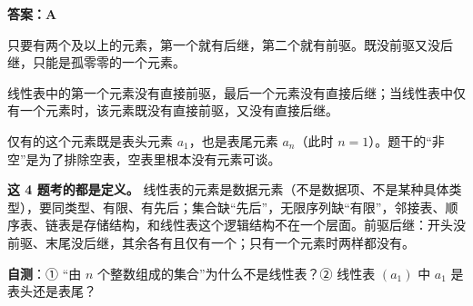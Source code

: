 \documentclass[10.5pt,a4paper,oneside]{article}
\newcommand{\hlred}[1]{\textcolor{wdred}{\bfseries #1}}
\begin{document}
\hlred{\textbf{答案：A}}

\begin{videobox}

只要有两个及以上的元素，第一个就有后继，第二个就有前驱。既没前驱又没后继，只能是孤零零的一个元素。

\end{videobox}

\begin{jiexibox}

线性表中的第一个元素没有直接前驱，最后一个元素没有直接后继；当线性表中仅有一个元素时，该元素既没有直接前驱，又没有直接后继。

\end{jiexibox}

\begin{addbox}

仅有的这个元素既是表头元素 \(a_1\)，也是表尾元素 \(a_n\)（此时
\(n=1\)）。题干的“非空”是为了排除空表，空表里根本没有元素可谈。

\end{addbox}

\begin{summarybox}

\textbf{这 4 题考的都是定义。}
线性表的元素是数据元素（不是数据项、不是某种具体类型），要同类型、有限、有先后；集合缺“先后”，无限序列缺“有限”，邻接表、顺序表、链表是存储结构，和线性表这个逻辑结构不在一个层面。前驱后继：开头没前驱、末尾没后继，其余各有且仅有一个；只有一个元素时两样都没有。

\textbf{自测}：① “由 \(n\) 个整数组成的集合”为什么不是线性表？② 线性表
\((a_1)\) 中 \(a_1\) 是表头还是表尾？

\end{summarybox}
\end{document}
